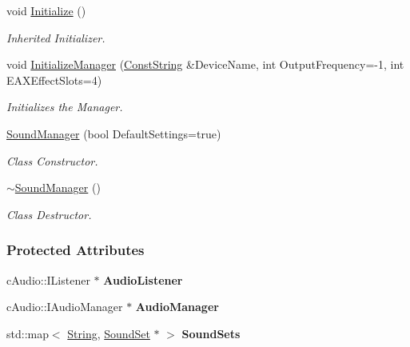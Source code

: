 \begin{DoxyCompactItemize}
void \hyperlink{classphys_1_1SoundManager_ae6d3957f965b54e06ec540e903cec68d}{Initialize} ()
\begin{DoxyCompactList}\small\item\em Inherited Initializer. \item\end{DoxyCompactList}\item 
void \hyperlink{classphys_1_1SoundManager_a735ca3ad1554d70623ac60f38ca4cefc}{InitializeManager} (\hyperlink{namespacephys_a5ce5049f8b4bf88d6413c47b504ebb31}{ConstString} \&DeviceName, int OutputFrequency=-\/1, int EAXEffectSlots=4)
\begin{DoxyCompactList}\small\item\em Initializes the Manager. \item\end{DoxyCompactList}\item 
\hyperlink{classphys_1_1SoundManager_a42d41090652f8ef12d575d78881d6a05}{SoundManager} (bool DefaultSettings=true)
\begin{DoxyCompactList}\small\item\em Class Constructor. \item\end{DoxyCompactList}\item 
\hyperlink{classphys_1_1SoundManager_af557110e5f0eccc7be861f163e1670d0}{$\sim$SoundManager} ()
\begin{DoxyCompactList}\small\item\em Class Destructor. \item\end{DoxyCompactList}\end{DoxyCompactItemize}
\subsubsection*{Protected Attributes}
\begin{DoxyCompactItemize}
\item 
\hypertarget{classphys_1_1SoundManager_a5b882ae37b8fbe843eee1f865be72a51}{
cAudio::IListener $\ast$ {\bfseries AudioListener}}
\label{classphys_1_1SoundManager_a5b882ae37b8fbe843eee1f865be72a51}

\item 
\hypertarget{classphys_1_1SoundManager_a16bf0c35e031e2359d27c6b12536c98d}{
cAudio::IAudioManager $\ast$ {\bfseries AudioManager}}
\label{classphys_1_1SoundManager_a16bf0c35e031e2359d27c6b12536c98d}

\item 
\hypertarget{classphys_1_1SoundManager_a7a8e89ec9886d28cf6331930b4269fb3}{
std::map$<$ \hyperlink{namespacephys_aa03900411993de7fbfec4789bc1d392e}{String}, \hyperlink{classphys_1_1SoundSet}{SoundSet} $\ast$ $>$ {\bfseries SoundSets}}
\label{classphys_1_1SoundManager_a7a8e89ec9886d28cf6331930b4269fb3}

\end{DoxyCompactItemize}


